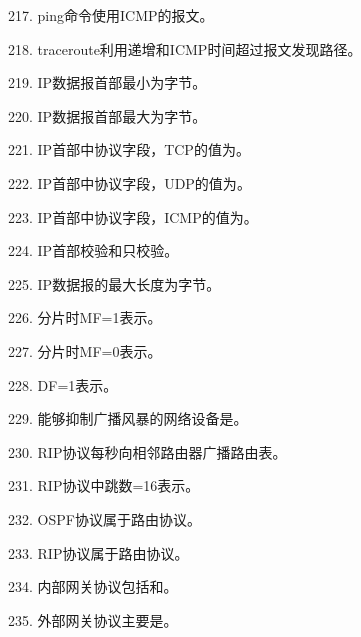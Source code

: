 217. ping命令使用ICMP的\underline{\hspace{2cm}}报文。

218. traceroute利用\underline{\hspace{2cm}}递增和ICMP时间超过报文发现路径。

219. IP数据报首部最小为\underline{\hspace{2cm}}字节。

220. IP数据报首部最大为\underline{\hspace{2cm}}字节。

221. IP首部中协议字段，TCP的值为\underline{\hspace{2cm}}。

222. IP首部中协议字段，UDP的值为\underline{\hspace{2cm}}。

223. IP首部中协议字段，ICMP的值为\underline{\hspace{2cm}}。

224. IP首部校验和只校验\underline{\hspace{2cm}}。

225. IP数据报的最大长度为\underline{\hspace{2cm}}字节。

226. 分片时MF=1表示\underline{\hspace{2cm}}。

227. 分片时MF=0表示\underline{\hspace{2cm}}。

228. DF=1表示\underline{\hspace{2cm}}。

229. 能够抑制广播风暴的网络设备是\underline{\hspace{2cm}}。

230. RIP协议每\underline{\hspace{2cm}}秒向相邻路由器广播路由表。

231. RIP协议中跳数=16表示\underline{\hspace{2cm}}。

232. OSPF协议属于\underline{\hspace{2cm}}路由协议。

233. RIP协议属于\underline{\hspace{2cm}}路由协议。

234. 内部网关协议包括\underline{\hspace{2cm}}和\underline{\hspace{2cm}}。

235. 外部网关协议主要是\underline{\hspace{2cm}}。

